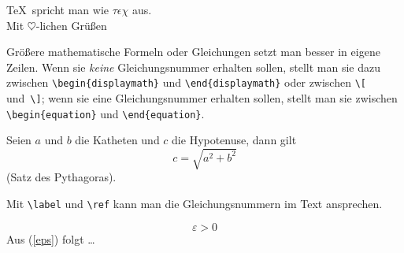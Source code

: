 \begin{LTXexample}
\TeX\ spricht man wie
 $\tau\epsilon\chi$ aus.\\
Mit $\heartsuit$-lichen
 Grü\ss en
\end{LTXexample}

 
Größere mathematische Formeln oder Gleichungen setzt man besser
in eigene Zeilen. Wenn sie \emph{keine} Gleichungsnummer erhalten 
sollen, stellt man sie dazu zwischen \lstinline|\begin{displaymath}| und
\lstinline|\end{displaymath}| oder zwischen \lstinline|\[| und~\lstinline|\]|; 
wenn sie eine Gleichungsnummer erhalten sollen, stellt man sie
zwischen \lstinline|\begin{equation}| und \lstinline|\end{equation}|.

\begin{LTXexample}
Seien $a$ und $b$ die Katheten
und $c$ die Hypotenuse,
dann gilt
\begin{equation}
c = \sqrt{  a^{2}+b^{2}  }
\end{equation}
(Satz des Pythagoras).
\end{LTXexample}


Mit \lstinline|\label| und \lstinline|\ref| kann man die Gleichungsnummern
im Text ansprechen.

\let\origlabel\label
\begin{LTXexample}[preset=\let\label\origlabel]
\begin{equation} \label{eps}
\varepsilon > 0
\end{equation}
 Aus (\ref{eps}) folgt \dots
\end{LTXexample}

 
 
